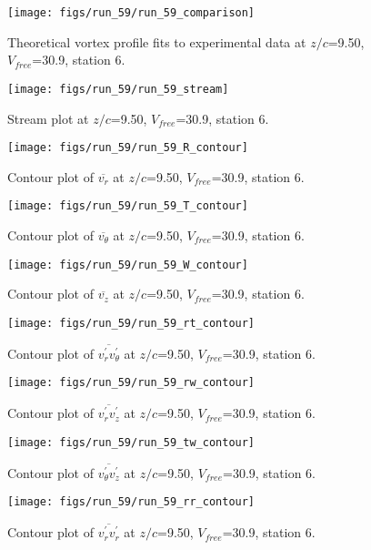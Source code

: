 \begin{figure}[H]
\centering
\texttt{[image: figs/run\_59/run\_59\_comparison]}
\caption{Theoretical vortex profile fits to experimental data at $z/c$=9.50, $V_{free}$=30.9, station 6.}
\end{figure}


\begin{figure}[H]
\centering
\texttt{[image: figs/run\_59/run\_59\_stream]}
\caption{Stream plot at $z/c$=9.50, $V_{free}$=30.9, station 6.}
\end{figure}


\begin{figure}[H]
\centering
\texttt{[image: figs/run\_59/run\_59\_R\_contour]}
\caption{Contour plot of $\overline{v_{r}}$ at $z/c$=9.50, $V_{free}$=30.9, station 6.}
\end{figure}


\begin{figure}[H]
\centering
\texttt{[image: figs/run\_59/run\_59\_T\_contour]}
\caption{Contour plot of $\overline{v_{\theta}}$ at $z/c$=9.50, $V_{free}$=30.9, station 6.}
\end{figure}


\begin{figure}[H]
\centering
\texttt{[image: figs/run\_59/run\_59\_W\_contour]}
\caption{Contour plot of $\overline{v_{z}}$ at $z/c$=9.50, $V_{free}$=30.9, station 6.}
\end{figure}


\begin{figure}[H]
\centering
\texttt{[image: figs/run\_59/run\_59\_rt\_contour]}
\caption{Contour plot of $\overline{v_{r}^{\prime} v_{\theta}^{\prime}}$ at $z/c$=9.50, $V_{free}$=30.9, station 6.}
\end{figure}


\begin{figure}[H]
\centering
\texttt{[image: figs/run\_59/run\_59\_rw\_contour]}
\caption{Contour plot of $\overline{v_{r}^{\prime} v_{z}^{\prime}}$ at $z/c$=9.50, $V_{free}$=30.9, station 6.}
\end{figure}


\begin{figure}[H]
\centering
\texttt{[image: figs/run\_59/run\_59\_tw\_contour]}
\caption{Contour plot of $\overline{v_{\theta}^{\prime} v_{z}^{\prime}}$ at $z/c$=9.50, $V_{free}$=30.9, station 6.}
\end{figure}


\begin{figure}[H]
\centering
\texttt{[image: figs/run\_59/run\_59\_rr\_contour]}
\caption{Contour plot of $\overline{v_{r}^{\prime} v_{r}^{\prime}}$ at $z/c$=9.50, $V_{free}$=30.9, station 6.}
\end{figure}


